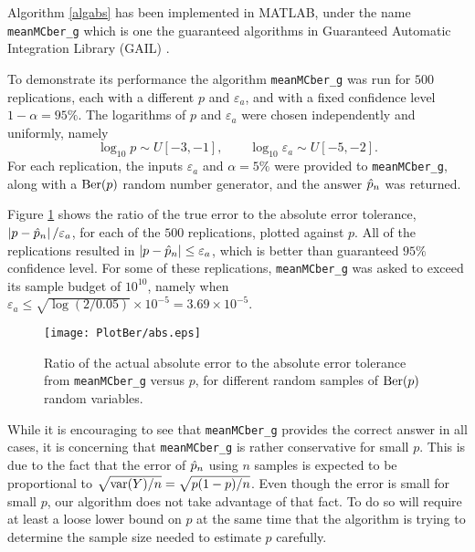 \documentclass{iitthesis}
\theoremstyle{definition}
\begin{document}
\label{sec:meanMCbergexample}

Algorithm \ref{algabs} has been implemented in MATLAB, under the name {\tt meanMCber\_g} which is one the guaranteed algorithms in Guaranteed Automatic Integration Library (GAIL) \cite{GAIL_2_1}.

To demonstrate its performance the algorithm {\tt meanMCber\_g} was run for $500$ replications, each with a different $p$ and $\varepsilon_a$, and with a fixed confidence level $1-\alpha=95\%$. The logarithms of $p$ and $\varepsilon_a$ were chosen independently and uniformly, namely 
\[
\log_{10} p \sim U[-3,-1], \qquad \log_{10} \varepsilon_a \sim U[-5,-2].
\]
For each replication, the inputs $\varepsilon_a$ and $\alpha=5\%$ were provided to {\tt meanMCber\_g}, along with a $\operatorname{Ber}(p)$ random number generator, and the answer $\hat{p}_n$ was returned.  

Figure \ref{fig:abserrex} shows the ratio of the true error to the absolute error tolerance, $\left \lvert p-\hat{p}_n \right \rvert/\varepsilon_a$, for each of the $500$ replications, plotted against $p$.  All of the replications resulted in $\left \lvert p-\hat{p}_n \right \rvert \le \varepsilon_a$, which is better than guaranteed $95\%$ confidence level.  For some of these replications, {\tt meanMCber\_g} was asked to exceed its sample budget of $10^{10}$, namely when $\varepsilon_a \le \sqrt{\log(2/0.05)} \times 10^{-5} = 3.69 \times 10^{-5}$.

  \begin{figure}[htbp]
    \centering
    \texttt{[image: PlotBer/abs.eps]} %
    \caption{Ratio of the actual absolute error to the absolute error tolerance from {\tt meanMCber\_g} versus $p$, for different random samples of $\operatorname{Ber}(p)$ random variables.}
    \label{fig:abserrex}
 \end{figure}

While it is encouraging to see that {\tt meanMCber\_g} provides the correct answer in all cases, it is concerning that {\tt meanMCber\_g} is rather conservative for small $p$.  This is due to the fact that the error of $\hat{p}_n$ using $n$ samples is expected to be proportional to $\sqrt{\operatorname{var}(Y)/n}=\sqrt{p(1-p)/n}$.  Even though the error is small for small $p$, our algorithm does not take advantage of that fact.  To do so will require at least a loose lower bound on $p$ at the same time that the algorithm is trying to determine the sample size needed to estimate $p$ carefully.
\end{document}
